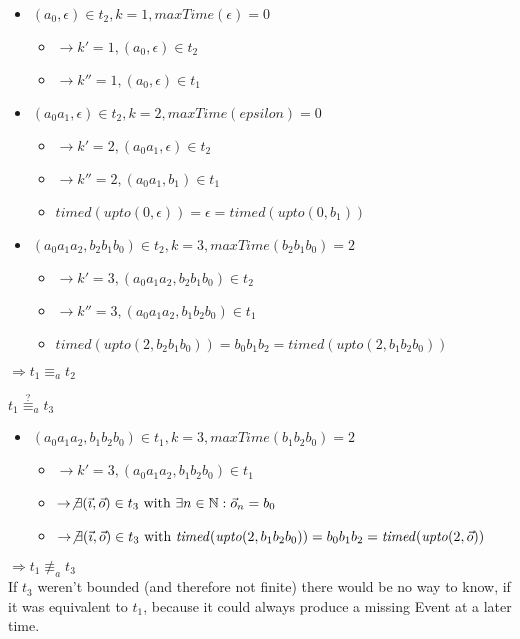 \begin{exmp}[name=Observational Equivalence]
\begin{itemize}[label={}]
    \item \((a_0, \epsilon)               \in t_2, k = 1, \mathit{maxTime}(\epsilon) = 0\)
      \begin{itemize}[label={}]
        \item \(\rightarrow k' = 1, (a_0, \epsilon)     \in t_2\)
        \item \(\rightarrow k'' = 1, (a_0, \epsilon)     \in t_1\)
      \end{itemize}
    \item \((a_0a_1, \epsilon)            \in t_2, k = 2, \mathit{maxTime}(epsilon) = 0\)
      \begin{itemize}[label={}]
        \item \(\rightarrow k' = 2, (a_0a_1, \epsilon)    \in t_2\)
        \item \(\rightarrow k'' = 2, (a_0a_1, b_1)    \in t_1\)
        \item \(\mathit{timed}(\mathit{upto}(0, \epsilon)) = \epsilon = \mathit{timed}(\mathit{upto}(0, b_1))\)
      \end{itemize}
    \item \((a_0a_1a_2, b_2b_1b_0)        \in t_2, k = 3, \mathit{maxTime}(b_2b_1b_0) = 2\)
      \begin{itemize}[label={}]
        \item \(\rightarrow k' = 3, (a_0a_1a_2, b_2b_1b_0)    \in t_2\)
        \item \(\rightarrow k'' = 3, (a_0a_1a_2, b_1b_2b_0)    \in t_1\)
        \item \(\mathit{timed}(\mathit{upto}(2, b_2b_1b_0)) = b_0b_1b_2 = \mathit{timed}(\mathit{upto}(2, b_1b_2b_0))\)
      \end{itemize}
  \end{itemize}
  \(\Rightarrow t_1 \equiv_a t_2\)

  \(t_1 \stackrel{?}{\equiv}_a t_3\)
  \begin{itemize}[label={}]
    \item \((a_0a_1a_2,b_1b_2b_0)      \in t_1, k=3, \mathit{maxTime}(b_1b_2b_0) = 2\)
      \begin{itemize}[label={}]
        \item \(\rightarrow k' = 3, (a_0a_1a_2, b_1b_2b_0)    \in t_1\)
        \item \(\rightarrow \not\exists (\vec{\imath}, \vec{o}) \in t_3\ \text{with } \exists n \in \mathbb{N}: \vec{o}_n = b_0\)
        \item \(\rightarrow \not\exists (\vec{\imath}, \vec{o}) \in t_3\ \text{with } \mathit{timed}(\mathit{upto}(2, b_1b_2b_0)) = b_0b_1b_2 = \mathit{timed}(\mathit{upto}(2,\vec{o}))\)
      \end{itemize}
  \end{itemize}
  \(\Rightarrow t_1 \not\equiv_a t_3\)\\
  If \(t_3\) weren't bounded (and therefore not finite) there would be no way to know, if it was equivalent to \(t_1\), because it could always produce a missing Event at a later time.


\end{exmp}

